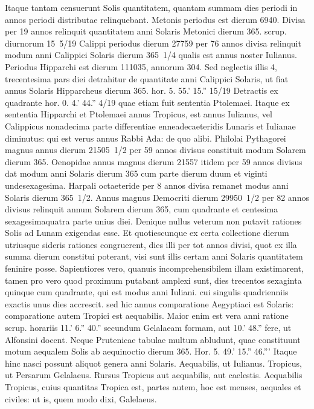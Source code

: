 Itaque tantam
censuerunt Solis quantitatem, quantam summam dies periodi in annos
periodi distributae relinquebant.
Metonis periodus est dierum
6940.
Divisa per 19 annos relinquit quantitatem anni Solaris Metonici
dierum 365. scrup. diurnorum 15~5/19 Calippi periodus dierum
27759 per 76 annos divisa relinquit modum anni Calippici Solaris
dierum 365~1/4 qualis est annus noster Iulianus.
Periodus Hipparchi
est dierum 111035, annorum 304.
Sed neglectis illis 4,
trecentesima pars diei detrahitur de quantitate anni Calippici Solaris,
ut fiat annus Solaris Hipparcheus
 dierum 365. hor. 5. 55.' 15.'' 15/19
Detractis ex quadrante hor. 0. 4.' 44.'' 4/19 quae etiam fuit sententia
Ptolemaei.
Itaque ex sententia Hipparchi et Ptolemaei annus
Tropicus, est annus Iulianus, vel Calippicus nonadecima parte
differentiae enneadecaeteridis Lunaris et Iulianae diminutus: qui
est verus annus Rabbi Ada: de quo alibi.
Philolai Pythagorei magnus
annus dierum 21505~1/2 per 59 annos divisus constituit modum
Solarem dierum 365.
Oenopidae annus magnus dierum 21557
itidem per 59 annos divisus dat modum anni Solaris dierum 365 cum
parte dierum duum et viginti undesexagesima.
Harpali octaeteride per
8 annos divisa remanet modus anni Solaris dierum 365~1/2.
Annus magnus
Democriti dierum 29950~1/2 per 82 annos divisus relinquit annum
Solarem dierum 365, cum quadrante et centesima sexagesimaquatra
parte unius diei.
Denique nullus veterum non putavit rationes
Solis ad Lunam exigendas esse.
Et quotiescunque ex certa collectione
dierum utriusque sideris rationes congruerent, dies illi per tot
annos divisi, quot ex illa summa dierum constitui poterant, visi sunt
illis certam anni Solaris quantitatem feninire posse.
Sapientiores vero,
quanuis incomprehensibilem illam existimarent, tamen pro vero quod
proximum putabant amplexi sunt, dies trecentos sexaginta quinque
cum quadrante, qui est modus anni Iuliani.
cui singulis quadrienniis
exactis unus dies accrescit.
sed hic annus comparatione Aegyptiaci
est Solaris: comparatione autem Tropici est aequabilis.
Maior
enim est vera anni ratione scrup. horariis 11.' 6.'' 40.'' secundum
Gelalaeam formam, aut 10.' 48.'' fere, ut Alfonsini docent.
Neque
Prutenicae tabulae multum abludunt, quae constituunt motum
aequalem Solis ab aequinoctio dierum 365. Hor. 5. 49.' 15.'' 46.'''
Itaque hinc nasci possunt aliquot genera anni Solaris.
Aequabilis,
ut Iulianus.
Tropicus, ut Persarum Gelalaeus.
Rursus Tropicus
aut aequabilis, aut caelestis.
Aequabilis
Tropicus, cuius quantitas
Tropica est, partes autem, hoc est menses, aequales et civiles: ut is,
quem modo dixi, Galelaeus.

